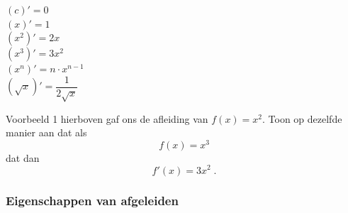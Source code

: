 \documentclass[12pt]{article}
\newenvironment{kader}
{
  \begin{mdframed}[nobreak=true]
  }{%
  \end{mdframed}
}
\begin{document}
\begin{kader}
  \begin{multicols}{3}
    $\left(c\right)'=0$\\
    $\left(x\right)'=1$\\
    $\left(x^2\right)'=2x$\\
    $\left(x^3\right)'=3x^2$\\
    $\left(x^n\right)'=n\cdot x^{n-1}$\\
    $\left(\sqrt{x}\right)'=\dfrac{1}{2\sqrt{x}}$\\
  \end{multicols}
\end{kader}

\begin{oefening}
  Voorbeeld 1 hierboven gaf ons de afleiding van $f(x)=x^2$. Toon op dezelfde manier aan dat als
  $$f(x)=x^3$$
  dat dan
  $$f'(x)=3x^2\;.$$
\end{oefening}

\subsubsection*{Eigenschappen van afgeleiden}
\end{document}
